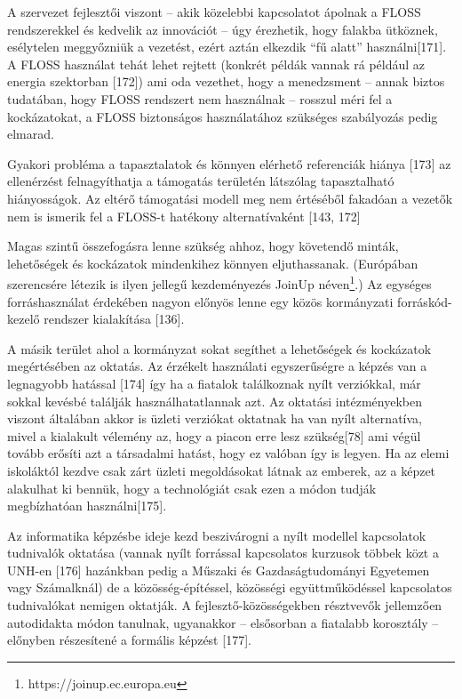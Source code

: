 \documentclass[12pt,magyar,a4paper,oneside]{scrreprt}
\begin{document}
A szervezet fejlesztői viszont -- akik közelebbi kapcsolatot ápolnak a
FLOSS rendszerekkel és kedvelik az innovációt -- úgy érezhetik, hogy
falakba ütköznek, esélytelen meggyőzniük a vezetést, ezért aztán
elkezdik ``fű alatt'' használni{[}171{]}. A FLOSS használat tehát lehet
rejtett (konkrét példák vannak rá például az energia szektorban
{[}172{]}) ami oda vezethet, hogy a menedzsment -- annak biztos
tudatában, hogy FLOSS rendszert nem használnak -- rosszul méri fel a
kockázatokat, a FLOSS biztonságos használatához szükséges szabályozás
pedig elmarad.

Gyakori probléma a tapasztalatok és könnyen elérhető referenciák hiánya
{[}173{]} az ellenérzést felnagyíthatja a támogatás területén látszólag
tapasztalható hiányosságok. Az eltérő támogatási modell meg nem
értéséből fakadóan a vezetők nem is ismerik fel a FLOSS-t hatékony
alternatívaként {[}143, 172{]}

Magas szintű összefogásra lenne szükség ahhoz, hogy követendő minták,
lehetőségek és kockázatok mindenkihez könnyen eljuthassanak. (Európában
szerencsére létezik is ilyen jellegű kezdeményezés JoinUp
néven\footnote{https://joinup.ec.europa.eu}.) Az egységes
forráshasználat érdekében nagyon előnyös lenne egy közös kormányzati
forráskód-kezelő rendszer kialakítása {[}136{]}.

A másik terület ahol a kormányzat sokat segíthet a lehetőségek és
kockázatok megértésében az oktatás. Az érzékelt használati egyszerűségre
a képzés van a legnagyobb hatással {[}174{]} így ha a fiatalok
találkoznak nyílt verziókkal, már sokkal kevésbé találják
használhatatlannak azt. Az oktatási intézményekben viszont általában
akkor is üzleti verziókat oktatnak ha van nyílt alternatíva, mivel a
kialakult vélemény az, hogy a piacon erre lesz szükség{[}78{]} ami végül
tovább erősíti azt a társadalmi hatást, hogy ez valóban így is legyen.
Ha az elemi iskoláktól kezdve csak zárt üzleti megoldásokat látnak az
emberek, az a képzet alakulhat ki bennük, hogy a technológiát csak ezen
a módon tudják megbízhatóan használni{[}175{]}.

Az informatika képzésbe ideje kezd beszivárogni a nyílt modellel
kapcsolatok tudnivalók oktatása (vannak nyílt forrással kapcsolatos
kurzusok többek közt a UNH-en {[}176{]} hazánkban pedig a Műszaki és
Gazdaságtudományi Egyetemen vagy Számalknál) de a közösség-építéssel,
közösségi együttműködéssel kapcsolatos tudnivalókat nemigen oktatják. A
fejlesztő-közösségekben résztvevők jellemzően autodidakta módon
tanulnak, ugyanakkor -- elsősorban a fiatalabb korosztály -- előnyben
részesítené a formális képzést {[}177{]}.
\end{document}
